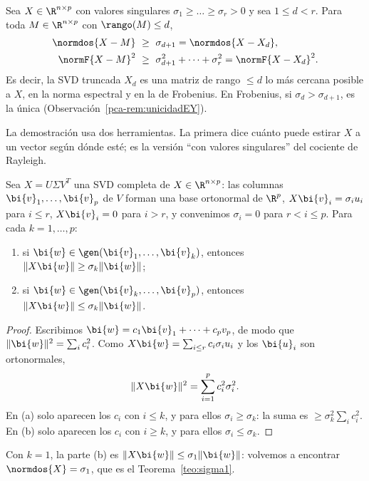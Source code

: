 \begin{theorem}\label{pca-teo:EY}
Sea $X\in\R^{n\times p}$ con valores singulares $\sigma_1\ge\dots\ge\sigma_r>0$
y sea $1\le d<r$. Para toda $M\in\R^{n\times p}$ con $\rango(M)\le d$,
\begin{align}
\normdos{X-M}&\ \ge\ \sigma_{d+1}=\normdos{X-X_d},\label{pca-eq:EY2}\\
\normF{X-M}^2&\ \ge\ \sigma_{d+1}^2+\dots+\sigma_r^2=\normF{X-X_d}^2 .\label{pca-eq:EY}
\end{align}
Es decir, la SVD truncada $X_d$ es una matriz de rango $\le d$ lo más cercana
posible a $X$, en la norma espectral y en la de Frobenius. En Frobenius, si
$\sigma_d>\sigma_{d+1}$, es la única (Observación~\ref{pca-rem:unicidadEY}).
\end{theorem}

La demostración usa dos herramientas. La primera dice cuánto puede estirar $X$
a un vector según dónde esté; es la versión ``con valores singulares'' del
cociente de Rayleigh.

\begin{lema}\label{pca-lema:estira}
Sea $X=U\Sigma V^T$ una SVD completa de $X\in\R^{n\times p}$: las columnas
$\bi{v}_1,\dots,\bi{v}_p$ de $V$ forman una base ortonormal de $\R^p$, $X\bi{v}_i=\sigma_iu_i$
para $i\le r$, $X\bi{v}_i=0$ para $i>r$, y convenimos $\sigma_i=0$ para $r<i\le p$.
Para cada $k=1,\dots,p$:
\begin{enumerate}[label=(\alph*),leftmargin=*]
\item si $\bi{w}\in\gen(\bi{v}_1,\dots,\bi{v}_k)$, entonces $\|X\bi{w}\|\ge\sigma_k\|\bi{w}\|$;
\item si $\bi{w}\in\gen(\bi{v}_k,\dots,\bi{v}_p)$, entonces $\|X\bi{w}\|\le\sigma_k\|\bi{w}\|$.
\end{enumerate}
\end{lema}

\begin{proof}
Escribimos $\bi{w}=c_1\bi{v}_1+\dots+c_pv_p$, de modo que $\|\bi{w}\|^2=\sum_ic_i^2$. Como
$X\bi{w}=\sum_{i\le r}c_i\sigma_iu_i$ y los $\bi{u}_i$ son ortonormales,
\[
\|X\bi{w}\|^2=\sum_{i=1}^pc_i^2\sigma_i^2 .
\]
En (a) solo aparecen los $c_i$ con $i\le k$, y para ellos $\sigma_i\ge\sigma_k$:
la suma es $\ge\sigma_k^2\sum_ic_i^2$. En (b) solo aparecen los $c_i$ con
$i\ge k$, y para ellos $\sigma_i\le\sigma_k$.
\end{proof}

Con $k=1$, la parte (b) es $\|X\bi{w}\|\le\sigma_1\|\bi{w}\|$: volvemos a encontrar
$\normdos{X}=\sigma_1$, que es el Teorema~\ref{teo:sigma1}.

